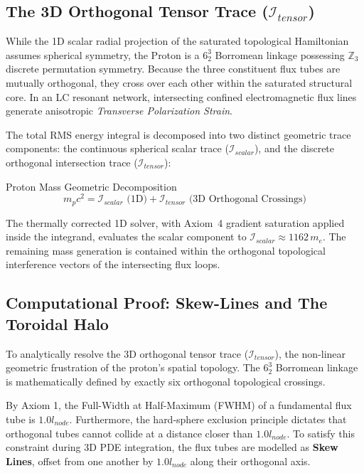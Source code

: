 \subsection{The 3D Orthogonal Tensor Trace ($\mathcal{I}_{tensor}$)}
While the 1D scalar radial projection of the saturated topological Hamiltonian assumes spherical symmetry, the Proton is a $6^3_2$ Borromean linkage possessing $\mathbb{Z}_3$ discrete permutation symmetry. Because the three constituent flux tubes are mutually orthogonal, they cross over each other within the saturated structural core. In an LC resonant network, intersecting confined electromagnetic flux lines generate anisotropic \textit{Transverse Polarization Strain}. 

The total RMS energy integral is decomposed into two distinct geometric trace components: the continuous spherical scalar trace ($\mathcal{I}_{scalar}$), and the discrete orthogonal intersection trace ($\mathcal{I}_{tensor}$):
\begin{resultbox}{Proton Mass Geometric Decomposition}
\begin{equation}
m_p c^2 = \mathcal{I}_{scalar} \text{ (1D)} + \mathcal{I}_{tensor} \text{ (3D Orthogonal Crossings)}
\end{equation}
\end{resultbox}

The thermally corrected 1D solver, with Axiom~4 gradient saturation applied inside the integrand, evaluates the scalar component to $\mathcal{I}_{scalar} \approx 1162\,m_e$. The remaining mass generation is contained within the orthogonal topological interference vectors of the intersecting flux loops.

\subsection{Computational Proof: Skew-Lines and The Toroidal Halo}
To analytically resolve the 3D orthogonal tensor trace ($\mathcal{I}_{tensor}$), the non-linear geometric frustration of the proton's spatial topology. The $6^3_2$ Borromean linkage is mathematically defined by exactly six orthogonal topological crossings.

By Axiom 1, the Full-Width at Half-Maximum (FWHM) of a fundamental flux tube is $1.0 l_{node}$. Furthermore, the hard-sphere exclusion principle dictates that orthogonal tubes cannot collide at a distance closer than $1.0 l_{node}$. To satisfy this constraint during 3D PDE integration, the flux tubes are modelled as \textbf{Skew Lines}, offset from one another by $1.0 l_{node}$ along their orthogonal axis.

